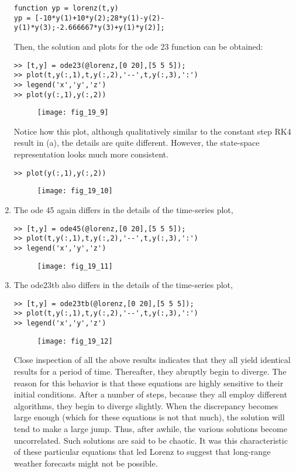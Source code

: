 \documentclass[../main.tex]{subfiles}
\begin{document}
\begin{enumerate}[label=\bfseries(\alph*)]
	\bigbreak
\begin{lstlisting}[numbers=none]
function yp = lorenz(t,y)
yp = [-10*y(1)+10*y(2);28*y(1)-y(2)-y(1)*y(3);-2.666667*y(3)+y(1)*y(2)]; 
\end{lstlisting}
	\bigbreak
Then, the solution and plots for the ode 23 function can be obtained:
	\bigbreak
\begin{lstlisting}[numbers=none]
>> [t,y] = ode23(@lorenz,[0 20],[5 5 5]);
>> plot(t,y(:,1),t,y(:,2),'--',t,y(:,3),':')
>> legend('x','y','z')
>> plot(y(:,1),y(:,2))
\end{lstlisting}
	\bigbreak
	\begin{figure}[H]
		\texttt{[image: fig\_19\_9]}
		\label{fig:fig_19_9}
	\end{figure}
	\bigbreak
Notice how this plot, although qualitatively similar to the constant step RK4 result in (a), the details are quite different. However, the state-space representation looks much more consistent.
	\bigbreak
\begin{lstlisting}[numbers=none]
>> plot(y(:,1),y(:,2))
\end{lstlisting}
	\bigbreak
	\begin{figure}[H]
		\texttt{[image: fig\_19\_10]}
		\label{fig:fig_19_10}
	\end{figure}
	\bigbreak
\item The ode 45 again differs in the details of the time-series plot,
	\bigbreak
\begin{lstlisting}[numbers=none]
>> [t,y] = ode45(@lorenz,[0 20],[5 5 5]);
>> plot(t,y(:,1),t,y(:,2),'--',t,y(:,3),':')
>> legend('x','y','z') 
\end{lstlisting}
	\bigbreak
	\begin{figure}[H]
		\texttt{[image: fig\_19\_11]}
		\label{fig:fig_19_11}
	\end{figure}
	\bigbreak
\item The ode23tb also differs in the details of the time-series plot,
	\bigbreak
\begin{lstlisting}[numbers=none]
>> [t,y] = ode23tb(@lorenz,[0 20],[5 5 5]);
>> plot(t,y(:,1),t,y(:,2),'--',t,y(:,3),':')
>> legend('x','y','z') 
\end{lstlisting}
	\bigbreak
	\begin{figure}[H]
		\texttt{[image: fig\_19\_12]}
		\label{fig:fig_19_12}
	\end{figure}
	\bigbreak
\begin{blockquote}
Close inspection of all the above results indicates that they all yield identical results for a period of time. Thereafter, they abruptly begin to diverge. The reason for this behavior is that these equations are highly sensitive to their initial conditions. After a number of steps, because they all employ different algorithms, they begin to diverge slightly. When the discrepancy becomes large enough (which for these equations is not that much), the solution will tend to make a large jump. Thus, after awhile, the various solutions become uncorrelated. Such solutions are said to be chaotic. It was this characteristic of these particular equations that led Lorenz to suggest that long-range weather forecasts might not be possible.

\end{blockquote}
\end{enumerate}
\end{document}
